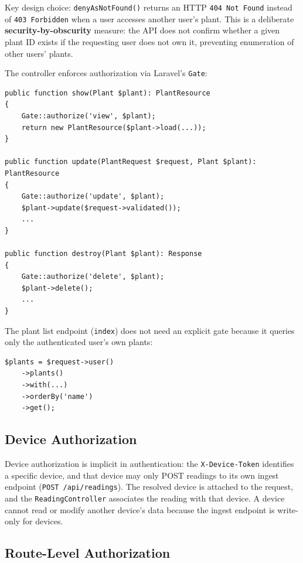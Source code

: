 \documentclass[11pt,a4paper]{article}
\begin{document}
Key design choice: \texttt{denyAsNotFound()} returns an HTTP \texttt{404 Not Found} instead of \texttt{403 Forbidden} when a user accesses another user's plant. This is a deliberate \textbf{security-by-obscurity} measure: the API does not confirm whether a given plant ID exists if the requesting user does not own it, preventing enumeration of other users' plants.

The controller enforces authorization via Laravel's \texttt{Gate}:

\begin{lstlisting}[caption=Gate::authorize in PlantController]
public function show(Plant $plant): PlantResource
{
    Gate::authorize('view', $plant);
    return new PlantResource($plant->load(...));
}

public function update(PlantRequest $request, Plant $plant): PlantResource
{
    Gate::authorize('update', $plant);
    $plant->update($request->validated());
    ...
}

public function destroy(Plant $plant): Response
{
    Gate::authorize('delete', $plant);
    $plant->delete();
    ...
}
\end{lstlisting}

The plant list endpoint (\texttt{index}) does not need an explicit gate because it queries only the authenticated user's own plants:

\begin{lstlisting}[caption=User-scoped plant list]
$plants = $request->user()
    ->plants()
    ->with(...)
    ->orderBy('name')
    ->get();
\end{lstlisting}

\subsection{Device Authorization}

Device authorization is implicit in authentication: the \texttt{X-Device-Token} identifies a specific device, and that device may only POST readings to its own ingest endpoint (\texttt{POST /api/readings}). The resolved device is attached to the request, and the \texttt{ReadingController} associates the reading with that device. A device cannot read or modify another device's data because the ingest endpoint is write-only for devices.

\subsection{Route-Level Authorization}
\end{document}

